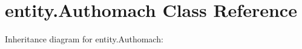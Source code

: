 \hypertarget{classentity_1_1_authomach}{}\section{entity.\+Authomach Class Reference}
\label{classentity_1_1_authomach}


Inheritance diagram for entity.\+Authomach\+:
